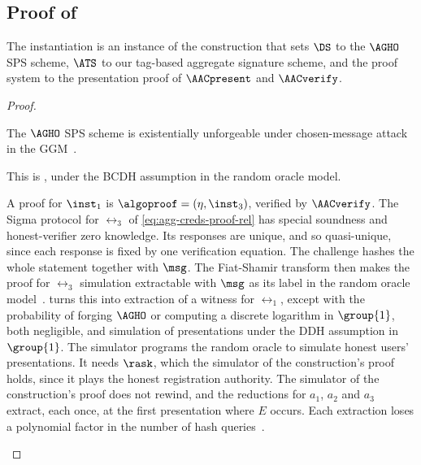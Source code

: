 \subsection{Proof of }\label{sec:agg-creds-proof-3}

The instantiation is an instance of the construction that sets $\DS$ to the
$\AGHO$ SPS scheme, $\ATS$ to our tag-based aggregate signature scheme, and the
proof system to the presentation proof of $\AACpresent$ and $\AACverify$.

\begin{proof}

  \begin{description}[style=unboxed]

        \item[$\DS$ is existentially unforgeable.] The $\AGHO$ SPS scheme is existentially
unforgeable under chosen-message attack in the GGM~\cite{C:AGHO11}.

    \item[$\ATS$ is existentially unforgeable under tag-based aggregation.] This
is , under the BCDH assumption in the random oracle
model.

    \item[The proof system is zero knowledge and simulation extractable.] A
proof for $\inst_1$ is $\algoproof = (\eta, \inst_3)$, verified by
$\AACverify$. The Sigma protocol for $\rel_3$ of
\eqref{eq:agg-creds-proof-rel} has special soundness and honest-verifier zero
knowledge. Its responses are unique, and so quasi-unique, since each response
is fixed by one verification equation. The challenge hashes the whole statement
together with $\msg$. The Fiat-Shamir transform then makes the proof for
$\rel_3$ simulation extractable with $\msg$ as its label in the random oracle
model~\cite{INDOCRYPT:FKMV12}.  turns this into
extraction of a witness for $\rel_1$, except with the probability of forging
$\AGHO$ or computing a discrete logarithm in $\group{1}$, both negligible, and
simulation of presentations under the DDH assumption in $\group{1}$. The
simulator programs the random oracle to simulate honest users' presentations.
It needs $\rask$, which the simulator of the construction's proof holds, since
it plays the honest registration authority. The
simulator of the construction's proof does not rewind, and the
reductions for $a_1$, $a_2$ and $a_3$ extract, each once, at the first
presentation where $E$ occurs. Each
extraction loses a polynomial factor in the number of hash
queries~\cite{JC:PoiSte00}.


\end{description}
\end{proof}
